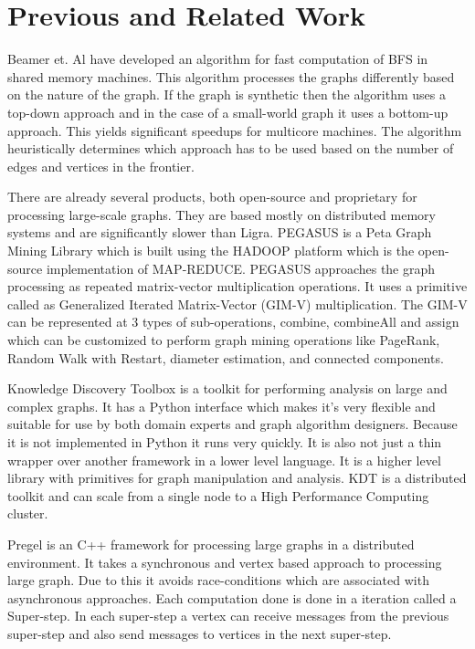 \documentclass[a4paper,10pt,twoside]{article}
\begin{document}
\section{Previous and Related Work}

Beamer et. Al \cite{Beamer:2012:DBS:2388996.2389013} have developed an algorithm for fast computation of BFS in shared memory machines. This algorithm processes the graphs differently based on the nature of the graph. If the graph is synthetic then the algorithm uses a top-down approach and in the case of a small-world graph it uses a bottom-up approach. This yields significant speedups for multicore machines. The algorithm heuristically determines which approach has to be used based on the number of edges and vertices in the frontier.

	There are already several products, both open-source and proprietary for processing large-scale graphs. They are based mostly on distributed memory systems and are significantly slower than Ligra. 
PEGASUS \cite{Kang:2011:PMP:1971122.1971124} is a Peta Graph Mining Library which is built using the HADOOP platform which is the open-source implementation of MAP-REDUCE. PEGASUS approaches the graph processing as repeated matrix-vector multiplication operations. It uses a primitive called as Generalized Iterated Matrix-Vector (GIM-V)  multiplication. The GIM-V can be represented at 3 types of sub-operations, combine, combineAll and assign which can be customized to perform graph mining operations like PageRank, Random Walk with Restart, diameter estimation, and connected components.

	Knowledge Discovery Toolbox \cite{lugowski2012flexible} is a toolkit for performing analysis on large and complex graphs. It has a Python interface which makes it's very flexible and suitable for use by both domain experts and graph algorithm designers. Because it is not implemented in Python it runs very quickly. It is also not just a thin wrapper over another framework in a lower level language. It is a higher level library with primitives for graph manipulation and analysis. KDT is a distributed toolkit and can scale from a single node to a High Performance Computing cluster.

	Pregel \cite{Malewicz:2010:PSL:1807167.1807184} is an C++ framework for processing large graphs in a distributed environment. It takes a synchronous and vertex based approach to processing large graph. Due to this it avoids race-conditions which are associated with asynchronous approaches. Each computation done is done in a iteration called a Super-step. In each super-step a vertex can receive messages from the previous super-step and also send messages to vertices in the next super-step.
\end{document}
